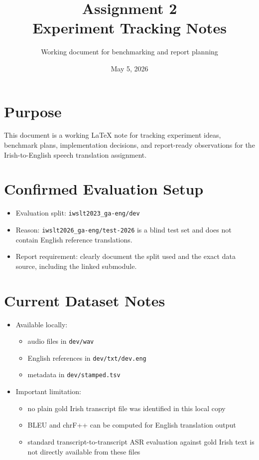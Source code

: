\documentclass[11pt,a4paper]{article}
\title{Assignment 2\\Experiment Tracking Notes}
\author{Working document for benchmarking and report planning}
\date{May 5, 2026}
\begin{document}
\maketitle

\section{Purpose}

This document is a working LaTeX note for tracking experiment ideas, benchmark plans, implementation decisions, and report-ready observations for the Irish-to-English speech translation assignment.

\section{Confirmed Evaluation Setup}

\begin{itemize}[leftmargin=1.4em]
  \item Evaluation split: \texttt{iwslt2023\_ga-eng/dev}
  \item Reason: \texttt{iwslt2026\_ga-eng/test-2026} is a blind test set and does not contain English reference translations.
  \item Report requirement: clearly document the split used and the exact data source, including the linked submodule.
\end{itemize}

\section{Current Dataset Notes}

\begin{itemize}[leftmargin=1.4em]
  \item Available locally:
  \begin{itemize}[leftmargin=1.6em]
    \item audio files in \texttt{dev/wav}
    \item English references in \texttt{dev/txt/dev.eng}
    \item metadata in \texttt{dev/stamped.tsv}
  \end{itemize}
  \item Important limitation:
  \begin{itemize}[leftmargin=1.6em]
    \item no plain gold Irish transcript file was identified in this local copy
    \item BLEU and chrF++ can be computed for English translation output
    \item standard transcript-to-transcript ASR evaluation against gold Irish text is not directly available from these files
  \end{itemize}
\end{itemize}
\end{document}
